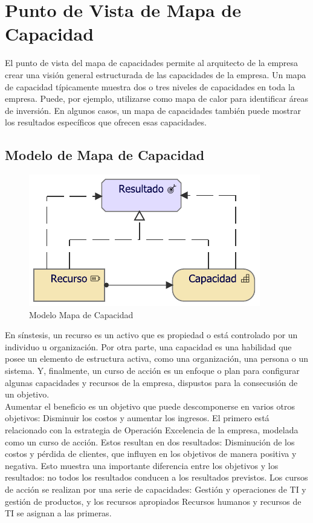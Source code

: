 \section{Punto de Vista de Mapa de Capacidad}

El punto de vista del mapa de capacidades permite al arquitecto de la empresa crear una visión general estructurada de las capacidades de la empresa. Un mapa de capacidad típicamente muestra dos o tres niveles de capacidades en toda la empresa. Puede, por ejemplo, utilizarse como mapa de calor para identificar áreas de inversión. En algunos casos, un mapa de capacidades también puede mostrar los resultados específicos que ofrecen esas capacidades.

\subsection{Modelo de Mapa de Capacidad}
\begin{figure}[h!]
	\centering
	\includegraphics[width=.5\linewidth]{imgs/caso/MapaCapacidad}
	\caption{Modelo Mapa de Capacidad}
\end{figure}

En sínstesis, un recurso es un activo que es propiedad o está controlado por un individuo u organización. Por otra parte, una capacidad es una habilidad que posee un elemento de estructura activa, como una organización, una persona o un sistema. Y, finalmente, un curso de acción es un enfoque o plan para configurar algunas capacidades y recursos de la empresa, dispustos para la consecusión de un objetivo. \\

Aumentar el beneficio es un objetivo que puede descomponerse en varios otros objetivos: Disminuir los costos y aumentar los ingresos. El primero está relacionado con la estrategia de Operación Excelencia de la empresa, modelada como un curso de acción. Estos resultan en dos resultados: Disminución de los costos y pérdida de clientes, que influyen en los objetivos de manera positiva y negativa. Esto muestra una importante diferencia entre los objetivos y los resultados: no todos los resultados conducen a los resultados previstos.
Los cursos de acción se realizan por una serie de capacidades: Gestión y operaciones de TI y gestión de productos, y los recursos apropiados Recursos humanos y recursos de TI se asignan a las primeras.

